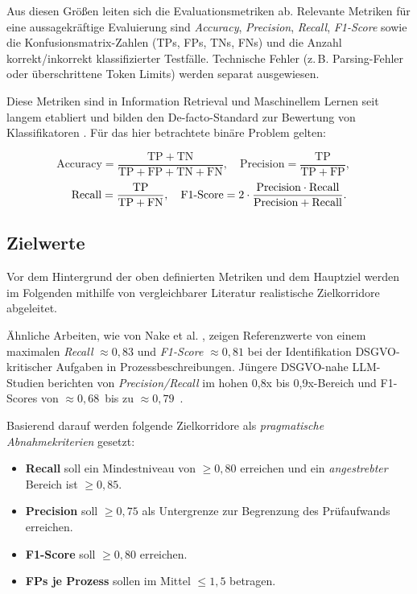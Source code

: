 Aus diesen Größen leiten sich die Evaluationsmetriken ab. Relevante Metriken für eine aussagekräftige Evaluierung sind \emph{Accuracy}, \emph{Precision}, \emph{Recall}, \emph{F1-Score} sowie die Konfusionsmatrix-Zahlen (\acp{TP}, \acp{FP}, \acp{TN}, \acp{FN}) und die Anzahl korrekt/inkorrekt klassifizierter Testfälle. Technische Fehler (z.\,B. Parsing-Fehler oder überschrittene Token Limits) werden separat ausgewiesen.

Diese Metriken sind in Information Retrieval und Maschinellem Lernen seit langem etabliert und bilden den De-facto-Standard zur Bewertung von Klassifikatoren \cite{manning2008ir, sokolova2009measureclassification, nake2023towards}. Für das hier betrachtete binäre Problem gelten:

\[
    \mathrm{Accuracy}=\frac{\mathrm{TP}+\mathrm{TN}}{\mathrm{TP}+\mathrm{FP}+\mathrm{TN}+\mathrm{FN}},\quad
    \mathrm{Precision}=\frac{\mathrm{TP}}{\mathrm{TP}+\mathrm{FP}},\quad
\]
\vspace{0.5em}
\[
    \mathrm{Recall}=\frac{\mathrm{TP}}{\mathrm{TP}+\mathrm{FN}},\quad
    \mathrm{F1\mathchar`-Score}=2\cdot\frac{\mathrm{Precision}\cdot \mathrm{Recall}}{\mathrm{Precision}+\mathrm{Recall}}.
\]

\subsection*{Zielwerte}

Vor dem Hintergrund der oben definierten Metriken und dem Hauptziel werden im Folgenden mithilfe von vergleichbarer Literatur realistische Zielkorridore abgeleitet.

Ähnliche Arbeiten, wie von Nake et al. \cite{nake2023towards}, zeigen Referenzwerte von einem maximalen \emph{Recall} $\approx 0{,}83$ und \emph{F1-Score} $\approx 0{,}81$ bei der Identifikation \ac{DSGVO}-kritischer Aufgaben in Prozessbeschreibungen. Jüngere \ac{DSGVO}-nahe \ac{LLM}-Studien berichten von \emph{Precision/Recall} im hohen 0{,}8x bis 0{,}9x-Bereich \cite{hooda2024policylr} und F1-Scores von $\approx 0{,}68$~bis zu $\approx 0{,}79$~\cite{schwerin2024systematic}.

Basierend darauf werden folgende Zielkorridore als \emph{pragmatische Abnahmekriterien} gesetzt:

\begin{itemize}
    \item \textbf{Recall} soll ein Mindestniveau von $\geq 0{,}80$ erreichen und ein \emph{angestrebter} Bereich ist $\geq 0{,}85$.
    \item \textbf{Precision} soll $\geq 0{,}75$ als Untergrenze zur Begrenzung des Prüfaufwands erreichen.
    \item \textbf{F1-Score} soll $\geq 0{,}80$  erreichen.
    \item \textbf{\acp{FP} je Prozess} sollen im Mittel $\leq 1{,}5$ betragen.
\end{itemize}

